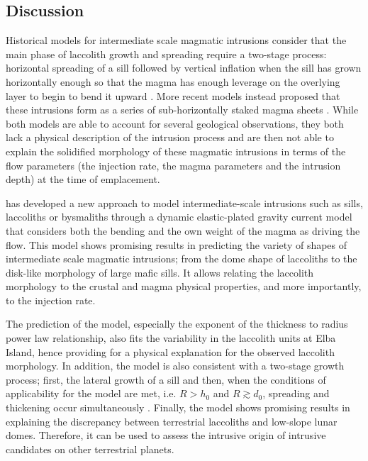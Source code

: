 \subsection{Discussion}
\label{C2-sec:discussion-1}

Historical models for intermediate  scale magmatic intrusions consider
that  the main  phase  of  laccolith growth  and  spreading require  a
two-stage process: horizontal spreading of a sill followed by vertical
inflation  when the  sill has  grown horizontally  enough so  that the
magma has enough  leverage on the overlying layer to  begin to bend it
upward \citep{Johnson:1973ho,Koch:1981if}.  More recent models instead
proposed that  these intrusions form  as a series  of sub-horizontally
staked magma  sheets \citep{Morgan:2008hj,Menand:2011ki}.   While both
models are able  to account for several  geological observations, they
both lack a physical description of the intrusion process and are then
not  able  to explain  the  solidified  morphology of  these  magmatic
intrusions in  terms of the  flow parameters (the injection  rate, the
magma parameters and the intrusion depth) at the time of emplacement.

\citet{Michaut:2011kg}  has   developed  a   new  approach   to  model
intermediate-scale intrusions such as  sills, laccoliths or bysmaliths
through a dynamic elastic-plated  gravity current model that considers
both the bending and the own weight  of the magma as driving the flow.
This model shows promising results in predicting the variety of shapes
of  intermediate scale  magmatic intrusions;  from the  dome shape  of
laccoliths to the disk-like morphology  of large mafic sills.  It allows
relating the  laccolith morphology to  the crustal and  magma physical
properties, and more importantly, to the injection rate. 

The prediction of the model,  especially the exponent of the thickness
to radius  power law  relationship, also fits  the variability  in the
laccolith  units  at  Elba  Island, hence  providing  for  a  physical
explanation for  the observed laccolith morphology.   In addition, the
model is also  consistent with a two-stage growth  process; first, the
lateral  growth   of  a  sill   and  then,  when  the   conditions  of
applicability   for   the   model   are   met,   i.e.    $R>h_0$   and
$R  \gtrsim  d_0$,  spreading   and  thickening  occur  simultaneously
\citep{Michaut:2011kg}. Finally, the model  shows promising results in
explaining   the  discrepancy   between  terrestrial   laccoliths  and
low-slope  lunar domes.   Therefore,  it  can be  used  to assess  the
intrusive origin of intrusive candidates on other terrestrial planets.

